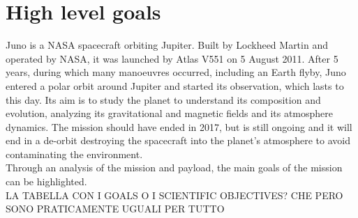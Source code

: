 \section{High level goals}
\label{sec:goals}
Juno is a NASA spacecraft orbiting Jupiter. Built by Lockheed Martin and operated by NASA, it was launched by Atlas V551 on 5 August 2011. After 5 years, during which many manoeuvres occurred, including an Earth flyby, Juno entered a polar orbit around Jupiter and started its observation, which lasts to this day. Its aim is to study the planet to understand its composition and evolution, analyzing its gravitational and magnetic fields and its atmosphere dynamics. The mission should have ended in 2017, but is still ongoing and it will end in a de-orbit destroying the spacecraft into the planet's atmosphere to avoid contaminating the environment. 
\\   

Through an analysis of the mission and payload, the main goals of the mission can be highlighted. \\


LA TABELLA CON I GOALS O I SCIENTIFIC OBJECTIVES? CHE PERO SONO PRATICAMENTE UGUALI PER TUTTO \\

